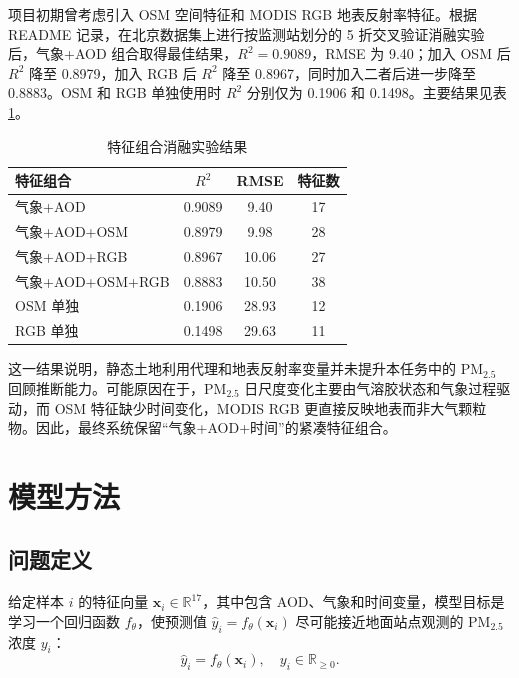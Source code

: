 \documentclass[UTF8,zihao=-4,a4paper]{ctexart}
\newcommand{\pmfine}{PM$_{2.5}$}
\newcommand{\aod}{AOD}
\begin{document}
项目初期曾考虑引入 OSM 空间特征和 MODIS RGB 地表反射率特征。根据 README 记录，在北京数据集上进行按监测站划分的 5 折交叉验证消融实验后，气象+\aod{} 组合取得最佳结果，$R^2=0.9089$，RMSE 为 9.40；加入 OSM 后 $R^2$ 降至 0.8979，加入 RGB 后 $R^2$ 降至 0.8967，同时加入二者后进一步降至 0.8883。OSM 和 RGB 单独使用时 $R^2$ 分别仅为 0.1906 和 0.1498。主要结果见表\ref{tab:ablation}。

\begin{table}[H]
  \centering
  \caption{特征组合消融实验结果}
  \label{tab:ablation}
  \begin{tabular}{lccc}
    \toprule
    特征组合 & $R^2$ & RMSE & 特征数 \\
    \midrule
    气象+\aod{} & 0.9089 & 9.40 & 17 \\
    气象+\aod{}+OSM & 0.8979 & 9.98 & 28 \\
    气象+\aod{}+RGB & 0.8967 & 10.06 & 27 \\
    气象+\aod{}+OSM+RGB & 0.8883 & 10.50 & 38 \\
    OSM 单独 & 0.1906 & 28.93 & 12 \\
    RGB 单独 & 0.1498 & 29.63 & 11 \\
    \bottomrule
  \end{tabular}
\end{table}

这一结果说明，静态土地利用代理和地表反射率变量并未提升本任务中的 \pmfine{} 回顾推断能力。可能原因在于，\pmfine{} 日尺度变化主要由气溶胶状态和气象过程驱动，而 OSM 特征缺少时间变化，MODIS RGB 更直接反映地表而非大气颗粒物。因此，最终系统保留“气象+\aod{}+时间”的紧凑特征组合。

\section{模型方法}

\subsection{问题定义}

给定样本 $i$ 的特征向量 $\mathbf{x}_i \in \mathbb{R}^{17}$，其中包含 \aod{}、气象和时间变量，模型目标是学习一个回归函数 $f_{\theta}$，使预测值 $\hat{y}_i=f_{\theta}(\mathbf{x}_i)$ 尽可能接近地面站点观测的 \pmfine{} 浓度 $y_i$：
\begin{equation}
  \hat{y}_i = f_{\theta}(\mathbf{x}_i), \quad
  y_i \in \mathbb{R}_{\geq 0}.
  \label{eq:regression}
\end{equation}
\end{document}
